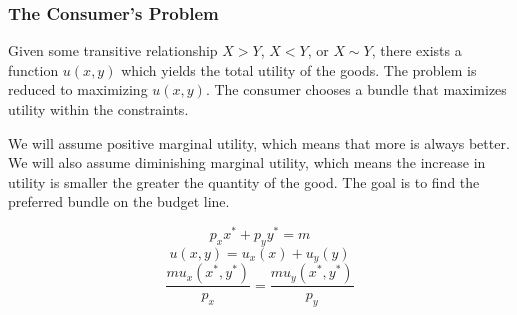 \documentclass{article}
\begin{document}
\subsubsection{The Consumer's Problem}
Given some transitive relationship \( X>Y \), \( X<Y \), or \( X\sim Y \),
there exists a function \( u(x,y) \) which yields the total utility of the
goods. The problem is reduced to maximizing \( u(x,y) \). The consumer
chooses a bundle that maximizes utility within the constraints. \par
We will assume positive marginal utility, which means that more is always
better. We will also assume diminishing marginal utility, which means the
increase in utility is smaller the greater the quantity of the good. The
goal is to find the preferred bundle on the budget line.
\begin{center}
\end{center}
\[ p_{x}x^{*}+p_{y}y^{*} = m \]
\[ u(x,y) = u_{x}(x)+u_{y}(y) \]
\[ \frac{mu_{x}(x^{*},y^{*})}{p_{x}} = \frac{mu_{y}(x^{*},y^{*})}{p_{y}} \]
\end{document}
